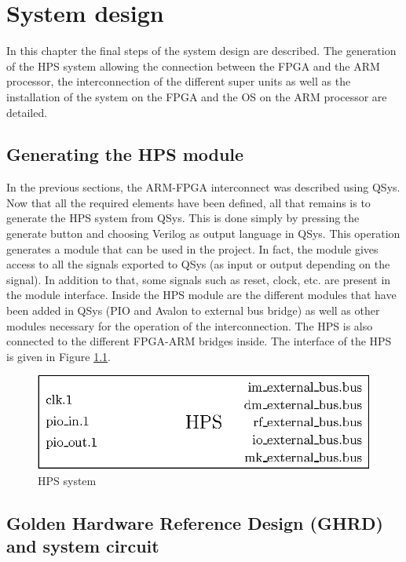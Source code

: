 \chapter{System design}

In this chapter the final steps of the system design are described. The generation of the HPS 
system allowing the connection between the FPGA and the ARM processor, the interconnection of the 
different super units as well as the installation of the system on the FPGA and the OS on the 
ARM processor are detailed.

\section{Generating the HPS module}

In the previous sections, the ARM-FPGA interconnect was described using QSys. Now that all the 
required elements have been defined, all that remains is to generate the HPS system from QSys. 
This is done simply by pressing the generate button and choosing Verilog as output language in QSys.
This operation generates a module that can be used in the project. In fact, the module gives access 
to all the signals exported to QSys (as input or output depending on the signal). In addition to 
that, some signals such as reset, clock, etc. are present in the module interface. Inside the HPS 
module are the different modules that have been added in QSys (PIO and Avalon to external bus bridge) 
as well as other modules necessary for the operation of the interconnection. The HPS is also 
connected to the different FPGA-ARM bridges inside. The interface of the HPS is given in 
Figure \ref{fig:system/hps}.

\begin{figure}[H]
    \centering
    \includegraphics[scale=0.8]{Chapter6-System/res/hps.eps}
    \caption{HPS system}
    \label{fig:system/hps}
\end{figure}

\section{Golden Hardware Reference Design (GHRD) and system circuit}

